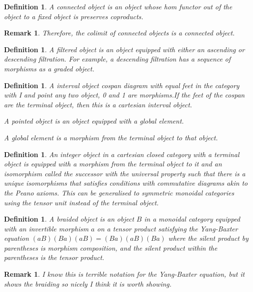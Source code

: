 \documentclass{tufte-book}
\newtheorem{definition}[theorem]{Definition}
\newtheorem{remark}[theorem]{Remark}
\begin{document}
 \begin{definition}
     A connected object is an object whose hom functor out of the object to a fixed object is preserves coproducts.
 \end{definition}
 
 \begin{remark}
     Therefore, the colimit of connected objects is a connected object.
 \end{remark}
 
 \begin{definition}
     A filtered object is an object equipped with either an ascending or descending filtration. For example, a descending filtration has a sequence of morphisms as a graded object.
 \end{definition}
 
 \begin{definition}
     A interval object cospan diagram with equal feet in the category with I and point any two object, 0 and 1 are morphisms.If the feet of the cospan are the terminal object, then this is a cartesian interval object.
 
     A pointed object is an object equipped with a global element.
 
     A global element is a morphism from the terminal object to that object.
 \end{definition}
 
 \begin{definition}
     An integer object in a cartesian closed category with a terminal object is equipped with a morphism from the terminal object to it and an isomorphism called the successor with the universal property such that there is a unique isomorphisms that satisfies conditions with commutative diagrams akin to the Peano axioms. This can be generalised to symmetric monoidal categories using the tensor unit instead of the terminal object.
 \end{definition}
 
 \begin{definition}
     A braided object is an object $B$ in a monoidal category equipped with an invertible morphism $a$ on a tensor product satisfying the Yang-Baxter equation $(a B)(B a)(a B) = (B a)(a B)(B a)$ where the silent product by parentheses is morphism composition, and the silent product within the parentheses is the tensor product.
 \end{definition}
 
 \begin{remark}
     I know this is terrible notation for the Yang-Baxter equation, but it shows the braiding so nicely I think it is worth showing.
 \end{remark}
 
\end{document}

